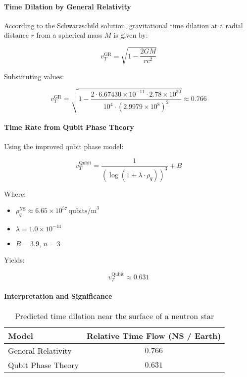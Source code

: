 \documentclass[12pt]{report} %
\begin{document}
\paragraph{Time Dilation by General Relativity}

According to the Schwarzschild solution, gravitational time dilation at a radial distance \( r \) from a spherical mass \( M \) is given by:

\[
v_T^{\text{GR}} = \sqrt{1 - \frac{2GM}{rc^2}}
\]

Substituting values:

\[
v_T^{\text{GR}} = \sqrt{1 - \frac{2 \cdot 6.67430 \times 10^{-11} \cdot 2.78 \times 10^{30}}{10^4 \cdot (2.9979 \times 10^8)^2}} \approx \boxed{0.766}
\]

\paragraph{Time Rate from Qubit Phase Theory}

Using the improved qubit phase model:

\[
v_T^{\text{Qubit}} = \frac{1}{\left( \log\left(1 + \lambda \cdot \rho_q \right) \right)^3} + B
\]

Where:
\begin{itemize}
  \item \( \rho_q^{\text{NS}} \approx 6.65 \times 10^{57} \, \text{qubits/m}^3 \)
  \item \( \lambda = 1.0 \times 10^{-44} \)
  \item \( B = 3.9 \), \( n = 3 \)
\end{itemize}

Yields:

\[
v_T^{\text{Qubit}} \approx \boxed{0.631}
\]

\paragraph{Interpretation and Significance}

\begin{table}[H]
\centering
\begin{tabular}{|l|c|}
\hline
\textbf{Model} & \textbf{Relative Time Flow (NS / Earth)} \\
\hline
General Relativity & \( 0.766 \) \\
Qubit Phase Theory & \( 0.631 \) \\
\hline
\end{tabular}
\caption{Predicted time dilation near the surface of a neutron star}
\end{table}
\end{document}
